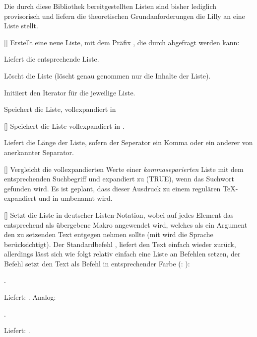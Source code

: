 Die durch diese Bibliothek bereitgestellten Listen sind bisher lediglich provisorisch und liefern die theoretischen Grundanforderungen die Lilly an eine Liste stellt.

%
%
%

[]
Erstellt eine neue Liste, mit dem Präfix , die durch  abgefragt werden kann:

Liefert die entsprechende Liste.

Löscht die Liste (löscht genau genommen nur die Inhalte der Liste).

Initiiert den Iterator für die jeweilige Liste.

Speichert die Liste, vollexpandiert in 

[]
Speichert die Liste vollexpandiert in .

Liefert die Länge der Liste, sofern der Seperator ein Komma oder ein anderer von  anerkannter Separator.

%
%
%

[]
Vergleicht die vollexpandierten Werte einer \emph{kommaseparierten} Liste mit dem entsprechenden Suchbegriff und expandiert zu  (TRUE), wenn das Suchwort gefunden wird. Es ist geplant, dass dieser Ausdruck zu einem regulären TeX- expandiert und in  umbenannt wird.

%
%
%

[]
Setzt die Liste in deutscher Listen-Notation, wobei auf jedes Element das entsprechend als  übergebene Makro angewendet wird, welches als ein Argument den zu setzenden Text entgegen nehmen sollte (mit  wird die Sprache berücksichtigt). Der Standardbefehl , liefert den Text einfach wieder zurück, allerdings lässt sich wie folgt relativ einfach eine Liste an Befehlen setzen, der Befehl  setzt den Text als Befehl in entsprechender Farbe (: ):
\begin{latex*}
.
\end{latex*}
Liefert: .
Analog:
\begin{latex*}[morekeywords={[5]{\\meinBefehl}}]
\newcommand{\meinBefehl}[1]{Jeah (\textit{#1})}
.
\end{latex*}\bgroup%
\newcommand{\meinBefehl}[1]{Jeah (\textit{#1})}%
Liefert: .\egroup
%
%
%

